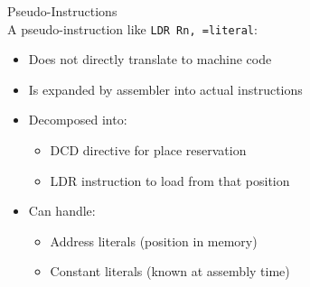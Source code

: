 \begin{concept}{Pseudo-Instructions}\\
A pseudo-instruction like \texttt{LDR Rn, =literal}:
\begin{itemize}
  \item Does not directly translate to machine code
  \item Is expanded by assembler into actual instructions
  \item Decomposed into:
    \begin{itemize}
      \item DCD directive for place reservation
      \item LDR instruction to load from that position
    \end{itemize}
  \item Can handle:
    \begin{itemize}
      \item Address literals (position in memory)
      \item Constant literals (known at assembly time)
    \end{itemize}
\end{itemize}
\end{concept}